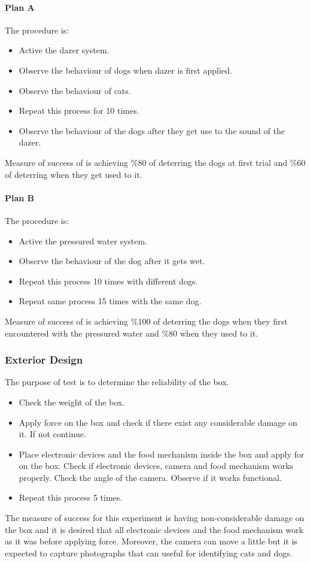 \paragraph{Plan A}
The procedure is:
\begin{itemize}
    \item Active the dazer system.
    \item Observe the behaviour of dogs when dazer is first applied.
    \item Observe the behaviour of cats.
    \item Repeat this process for 10 times.
    \item Observe the behaviour of the dogs after they get use to the sound of the dazer.
\end{itemize}
Measure of success of is achieving \%80 of deterring the dogs at first trial and \%60 of deterring when they get used to it. 

\paragraph{Plan B}
The procedure is:
\begin{itemize}
    \item Active the pressured water system.
    \item Observe the behaviour of the dog after it gets wet.
    \item Repeat this process 10 times with different dogs.
    \item Repeat same process 15 times with the same dog.
\end{itemize}
Measure of success of is achieving \%100 of deterring the dogs when they first encountered with the pressured water and \%80 when they used to it.  

\subsubsection{Exterior Design}
The purpose of test is to determine the reliability of the box.
\begin{itemize}
    \item Check the weight of the box. 
    \item Apply force on the box and check if there exist any considerable damage on it. If not continue.
    \item Place electronic devices and the food mechanism inside the box and apply for on the box. Check if electronic devices, camera and food mechanism works properly. Check the angle of the camera. Observe if it works functional. 
    \item Repeat this process 5 times.
\end{itemize}

The measure of success for this experiment is having non-considerable damage on the box and it is desired that all electronic devices and the food mechanism work as it was before applying force. Moreover, the camera can move a little but it is expected to capture photographs that can useful for identifying cats and dogs.